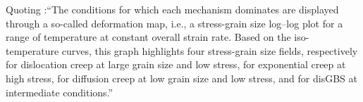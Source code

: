 

Quoting \cite{gupr14}:``The conditions for
which each mechanism dominates are displayed through a so-called deformation map, 
i.e., a stress-grain size log–log plot for a range of temperature at constant overall strain rate. 
Based on the iso-temperature
curves, this graph highlights four stress-grain size fields, respectively
for dislocation creep at large grain size and low stress, for exponential
creep at high stress, for diffusion creep at low grain size and low stress,
and for disGBS at intermediate conditions.''

